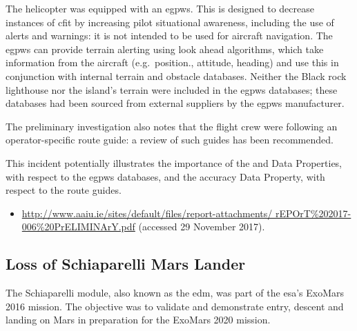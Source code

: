The helicopter was equipped with an \gls{egpws}. This is designed to decrease instances of \gls{cfit} by increasing pilot situational awareness, including the use of alerts and warnings: it is not intended to be used for aircraft navigation. The \gls{egpws} can provide terrain alerting using look ahead algorithms, which take information from the aircraft (e.g.\ position., attitude, heading) and use this in conjunction with internal terrain and obstacle databases. Neither the Black rock lighthouse nor the island's terrain were included in the \gls{egpws} databases; these databases had been sourced from external suppliers by the \gls{egpws} manufacturer.

The preliminary investigation also notes that the flight crew were following an operator-specific route guide: a review of such guides has been recommended.

This incident potentially illustrates the importance of the  and  Data Properties, with respect to the \gls{egpws} databases, and the \gls{accuracy} Data Property, with respect to the route guides.

\begin{samepage}
\begin{itemize}
  \item \raggedright{\href{http://www.aaiu.ie/sites/default/files/report-attachments/rEPOrT\%202017-006\%20PrELIMINArY.pdf}{http://www.aaiu.ie/sites/default/files/report-attachments/ rEPOrT\%202017-006\%20PrELIMINArY.pdf} (accessed 29 November 2017).}
\end{itemize}
\end{samepage}


\subsection{Loss of Schiaparelli Mars Lander} \label{bkm:incacc:schiaparelli}
The Schiaparelli module, also known as the \gls{edm}, was part of the \gls{esa}'s ExoMars 2016 mission. The objective was to validate and demonstrate entry, descent and landing on Mars in preparation for the ExoMars 2020 mission.

